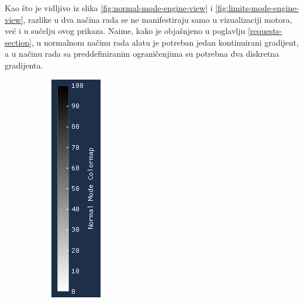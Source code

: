 \documentclass[times, utf8, diplomski]{fer}
\begin{document}
Kao što je vidljivo iz slika \ref{fig:normal-mode-engine-view} i \ref{fig:limits-mode-engine-view}, razlike u dva načina rada se ne manifestiraju samo u vizualizaciji motora, već i u sučelju ovog prikaza. Naime, kako je objašnjeno u poglavlju \ref{requests-section}, u normalnom načinu rada alatu je potreban jedan kontinuirani gradijent, a u načinu rada sa preddefiniranim ograničenjima su potrebna dva diskretna gradijenta.
\begin{figure} [H]
     \centering
     \begin{subfigure}[h]{0.16\textwidth}
         \centering
         \includegraphics[width=\textwidth]{linear_colormap.png}

\end{subfigure}
\end{figure}
\end{document}

